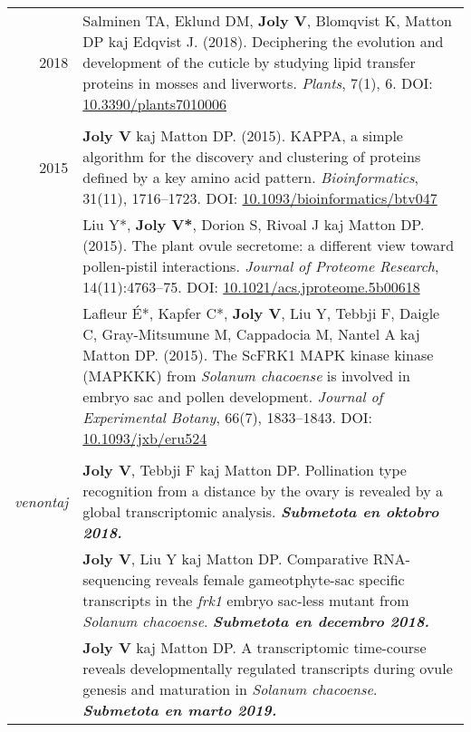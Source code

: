 \documentclass[letterpaper,12pt]{article}
\begin{document}
\begin{tabularx}{\textwidth}{@{}r|X@{}}

2018
& Salminen TA, Eklund DM, \textbf{Joly V}, Blomqvist K, Matton DP
  kaj Edqvist J. (2018).
  Deciphering the evolution and development of the cuticle by studying lipid
  transfer proteins in mosses and liverworts.
  \emph{Plants}, 7(1), 6.
  DOI: \href{http://doi.org/10.3390/plants7010006}{10.3390/plants7010006}
  \\

\multicolumn{2}{c}{} \\

2015
& \textbf{Joly V} kaj Matton DP. (2015).
  KAPPA, a simple algorithm for the discovery and clustering of proteins defined
  by a key amino acid pattern.
  \emph{Bioinformatics}, 31(11), 1716--1723.
  DOI: \href{http://doi.org/10.1093/bioinformatics/btv047}
  {10.1093/bioinformatics/btv047}
  \vspace{3mm}
  \\

& Liu Y*, \textbf{Joly V*}, Dorion S, Rivoal J kaj Matton DP. (2015).
  The plant ovule secretome: a different view toward pollen-pistil interactions.
  \emph{Journal of Proteome Research}, 14(11):4763--75.
  DOI: \href{http://doi.org/10.1021/acs.jproteome.5b00618}
  {10.1021/acs.jproteome.5b00618}
  \vspace{3mm}
  \\

& Lafleur É*, Kapfer C*, \textbf{Joly V}, Liu Y, Tebbji F, Daigle C,
  Gray-Mitsumune M, Cappadocia M, Nantel A kaj Matton DP. (2015).
  The ScFRK1 MAPK kinase kinase (MAPKKK) from \emph{Solanum chacoense} is
  involved in embryo sac and pollen development.
  \emph{Journal of Experimental Botany}, 66(7), 1833--1843.
  DOI: \href{http://doi.org/10.1093/jxb/eru524}{10.1093/jxb/eru524}
  \\

\multicolumn{2}{c}{} \\

{\em venontaj}
& \textbf{Joly V}, Tebbji F kaj Matton DP.
  Pollination type recognition from a distance by the ovary is revealed by a
  global transcriptomic analysis.
  {\bfseries\em Submetota en oktobro 2018.}
  \vspace{3mm}
  \\

& \textbf{Joly V}, Liu Y kaj Matton DP.
  Comparative RNA-sequencing reveals female gameotphyte-sac specific transcripts
  in the \emph{frk1} embryo sac-less mutant from \emph{Solanum chacoense}.
  {\bfseries\em Submetota en decembro 2018.}
  \vspace{3mm}
  \\

& \textbf{Joly V} kaj Matton DP.
  A transcriptomic time-course reveals developmentally regulated transcripts
  during ovule genesis and maturation in \emph{Solanum chacoense}.
  {\bfseries\em Submetota en marto 2019.} \\

\end{tabularx}
\end{document}
